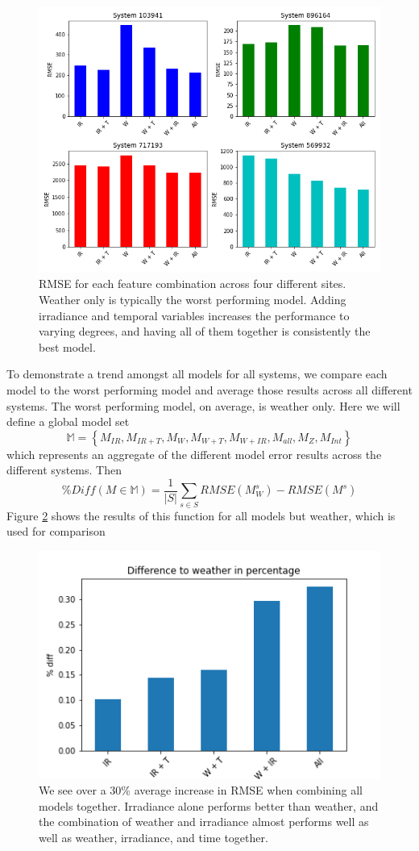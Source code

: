 \documentclass[11pt, fullpage,letterpaper]{article}
\begin{document}
\begin{figure}[!htb]
    \includegraphics[width=\textwidth]{4-1}
    \caption{RMSE for each feature combination across four different sites. Weather only is typically the worst performing model. Adding irradiance and temporal variables increases the performance to varying degrees, and having all of them together is consistently the best model.}
    \label{4-1}
\end{figure}
To demonstrate a trend amongst all models for all systems, we compare each model to the worst performing model and average those results across all different systems. The worst performing model, on average, is weather only. Here we will define a global model set $$\mathbb{M} = \left\{ M_{IR}, M_{IR+T}, M_{W}, M_{W+T}, M_{W+IR}, M_{all}, M_{Z}, M_{Int} \right\}$$ which represents an aggregate of the different model error results across the different systems. Then 
\[
    \%Diff(M \in \mathbb{M}) = \frac{1}{|S|} \sum_{s \in S} RMSE(M^s_W) - RMSE(M^s)
\]
Figure \ref{4-2} shows the results of this function for all models but weather, which is used for comparison

\begin{figure}[!htb]
    \centering
    \includegraphics[scale=0.75]{../plots/regression_report/4-2}
    \caption{We see over a 30\% average increase in RMSE when combining all models together. Irradiance alone performs better than weather, and the combination of weather and irradiance almost performs well as well as weather, irradiance, and time together.}
    \label{4-2}
\end{figure}
\end{document}
